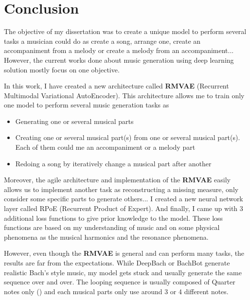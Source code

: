 \documentclass[12pt]{report}
\begin{document}

\chapter{Conclusion}

The objective of my dissertation was to create a unique model to perform several tasks a musician could do as create a song, arrange one, create an accompaniment from a melody or create a melody from an accompaniment... 
However, the current works done about music generation using deep learning solution mostly focus on one objective.

In this work, I have created a new architecture called \textbf{RMVAE} (Recurrent Multimodal Variational AutoEncoder).
This architecture allows me to train only one model to perform several music generation tasks as
\begin{itemize}
    \item Generating one or several musical parts
    \item Creating one or several musical part(s) from one or several musical part(s).
    Each of them could me an accompaniment or a melody part
    \item Redoing a song by iteratively change a musical part after another
\end{itemize}
Moreover, the agile architecture and implementation of the \textbf{RMVAE} easily allows us to implement another task as reconstructing a missing measure, only consider some specific parts to generate others...
I created a new neural network layer called RPoE (Recurrent Product of Expert).
And finally, I came up with 3 additional loss functions to give prior knowledge to the model.
These loss functions are based on my understanding of music and on some physical phenomena as the musical harmonics and the resonance phenomena.

However, even though the \textbf{RMVAE} is general and can perform many tasks, the results are far from the expectations.
While DeepBach \cite{hadjeres_deepbach:_2016} or BachBot \cite{liang_automatic_2017} generate realistic Bach's style music, my model gets stuck and usually generate the same sequence over and over.
The looping sequence is usually composed of Quarter notes only (\musQuarter) and each musical parts only use around 3 or 4 different notes.
\end{document}
